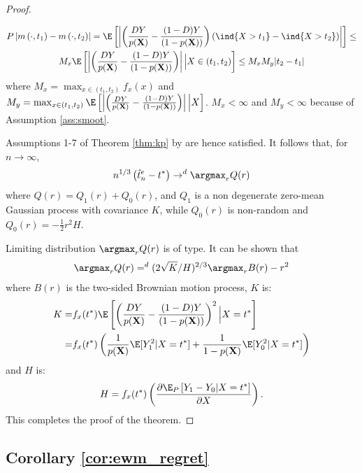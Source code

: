 {\begin{proof}
\begin{enumerate}
    \begin{gather}
        P\left|m\left(\cdot, t_1\right)-m\left(\cdot, t_2\right)\right| = \E\left[ \left| \left(\frac{D Y}{p(\textbf{X})} - \frac{(1-D) Y}{(1-p(\textbf{X}))} \right) (\ind\{X > t_1\} - \ind\{X > t_2\}) \right| \right] \leq \\
        M_x \E\left[ \left| \left(\frac{D Y}{p(\textbf{X})} - \frac{(1-D) Y}{(1-p(\textbf{X}))} \right)\right| \Big| X \in (t_1, t_2)  \right] \leq M_x M_y |t_2 - t_1|
    \end{gather}
    where $M_x = \max_{x \in (t_1, t_2)} f_x(x)$ and $M_y = \max_{x \in (t_1, t_2)} \E\left[ \left| \left(\frac{D Y}{p(\textbf{X})} - \frac{(1-D) Y}{(1-p(\textbf{X}))} \right)\right| \Big| X  \right]$. $M_x <\infty$ and $M_y <\infty$ because of Assumption \ref{ass:smoot}.
\end{enumerate}

Assumptions 1-7 of Theorem \ref{thm:kp} by \cite{kim1990cube} are hence satisfied. It follows that, for $n\rightarrow \infty$,
\begin{gather}
    n^{1 / 3}\left(\hat{t}^e_n-t^*\right) \rightarrow^d \argmax_{r}Q(r)
\end{gather}
where $Q(r) = Q_1(r) + Q_0(r)$, and $Q_1$ is a non degenerate zero-mean Gaussian process with covariance $K$, while $Q_0(r)$ is non-random and $Q_0(r) = -\frac{1}{2}r^2H$.

Limiting distribution $\argmax_{r}Q(r)$ is of \cite{chernoff1964estimation} type. It can be shown \citep{banerjee2001likelihood} that
\begin{gather}
    \argmax_r Q(r) =^d (2\sqrt{K}/H)^{2/3}\argmax_r B(r) - r^2
\end{gather}
where $B(r)$ is the two-sided Brownian motion process, $K$ is:
\begin{align}
    K =& f_x(t^*) \E \left[ \left(\frac{DY}{p(\textbf{X})} - \frac{(1-D) Y}{(1-p(\textbf{X}))}\right)^2 \Big| X = t^*\right] \\
    =& f_x(t^*) \left(\frac{1}{p(\textbf{X})} \E[Y_1^2|X = t^*] + \frac{1}{1-p(\textbf{X})} \E[Y_0^2|X = t^*] \right)
\end{align}
and $H$ is:
\begin{gather}
    H=  f_x(t^*) \left(\frac{\partial \E_P\left[Y_1 - Y_0 | X = t^* \right]}{\partial X} \right).
\end{gather}
This completes the proof of the theorem.
\end{proof}


\subsection*{Corollary \ref{cor:ewm_regret}}

}
